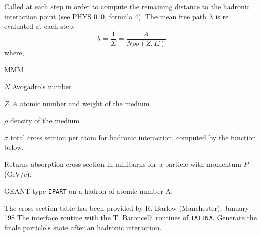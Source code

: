      
          
           
Called at each step in order to compute the remaining distance to the
hadronic interaction point (see PHYS 010, formula 4).
The mean free path $\lambda$ is re evaluated at each step:
\begin{equation}
\lambda = \frac{1}{\Sigma} = \frac{A}{N \rho \sigma (Z,E)}
\end{equation}
where,
\begin{DL}{MMM}
\item[$N$]     Avogadro's number
\item[$Z,A$]   atomic number and weight of the medium
\item[$\rho$]   density of the medium
\item[$\sigma$] total cross section per atom for hadronic interaction, computed
by the function  below.
\end{DL}
Returns absorption cross section in millibarns for a particle with
momentum $P$ (GeV/$c$).
 
GEANT type {\tt IPART} on a hadron of atomic number A.
 
The cross section table has been provided by R. Barlow (Manchester), January 198
The interface routine with the T. Baroncelli routines of {\tt  TATINA}.
Generate the finale particle's state after an hadronic interaction.
